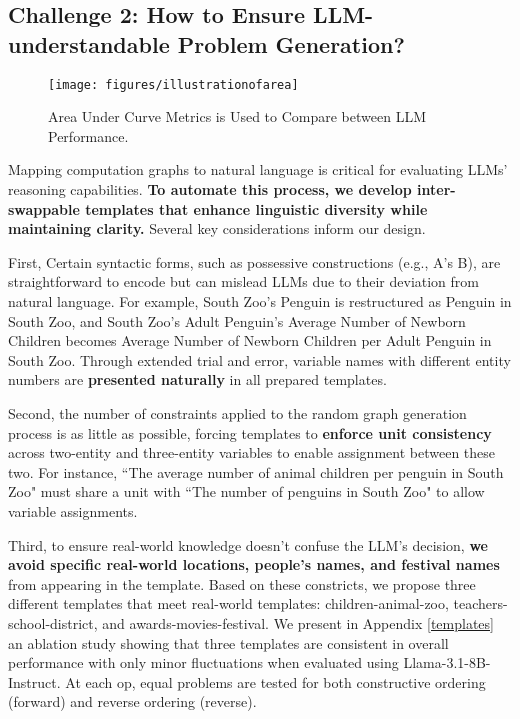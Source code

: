 \subsection{Challenge 2: How to Ensure LLM-understandable Problem Generation?} 
\label{attachlanguage} 
\begin{wrapfigure}{r}{0.35\textwidth} 
    \texttt{[image: figures/illustrationofarea]} 
    \caption{Area Under Curve Metrics is Used to Compare between LLM Performance.} 
    \label{areacurve} 
\end{wrapfigure} 
Mapping computation graphs to natural language is critical for evaluating LLMs' reasoning capabilities. \textbf{To automate this process, we develop inter-swappable templates that enhance linguistic diversity while maintaining clarity.} Several key considerations inform our design. 

First, Certain syntactic forms, such as possessive constructions (e.g., A’s B), are straightforward to encode but can mislead LLMs due to their deviation from natural language. For example, South Zoo’s Penguin is restructured as Penguin in South Zoo, and South Zoo’s Adult Penguin’s Average Number of Newborn Children becomes Average Number of Newborn Children per Adult Penguin in South Zoo. Through extended trial and error, variable names with different entity numbers are \textbf{presented naturally} in all prepared templates. 

Second, the number of constraints applied to the random graph generation process is as little as possible, forcing templates to \textbf{enforce unit consistency} across two-entity and three-entity variables to enable assignment between these two. For instance, ``The average number of animal children per penguin in South Zoo" must share a unit with ``The number of penguins in South Zoo" to allow variable assignments.

Third, to ensure real-world knowledge doesn't confuse the LLM's decision, \textbf{we avoid specific real-world locations, people's names, and festival names} from appearing in the template. 
Based on these constricts, we propose three different templates that meet real-world templates: children-animal-zoo, teachers-school-district, and awards-movies-festival. We present in Appendix \ref{templates} an ablation study showing that three templates are consistent in overall performance with only minor fluctuations when evaluated using Llama-3.1-8B-Instruct. At each op, equal problems are tested for both constructive ordering (forward) and reverse ordering (reverse). 

